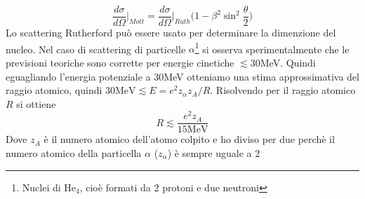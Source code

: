 \documentclass[11pt,a4paper]{article}
\begin{document}
		\begin{equation}
			\frac{d\sigma}{d\Omega}\Big|_{Mott}=\frac{d\sigma}{d\Omega}\Big|_{Ruth}\Big(1-\beta ^2\sin ^2\frac\theta 2\Big)
		\end{equation}
		Lo scattering Rutherford può essere usato per determinare la dimenzione del nucleo.\newline
		Nel caso di scattering di particelle $\alpha$\footnote{Nuclei di He$_4$, cioè formati da 2 protoni e due neutroni} si osserva sperimentalmente che le previsioni teoriche sono corrette per energie cinetiche  $\lesssim 30$MeV. Quindi eguagliando l'energia potenziale a $30$MeV otteniamo una stima approssimativa del raggio atomico, quindi $30 \textrm{MeV}\lesssim E=e^2z_\alpha z_A/R$. Risolvendo per il raggio atomico $R$ si ottiene
		\begin{equation}
			R\lesssim\frac{e^2z_A}{15 \textrm{MeV}}
		\end{equation}
		Dove $z_A$ è il numero atomico dell'atomo colpito e ho diviso per due perchè il numero atomico della particella $\alpha$ ($z_\alpha$) è sempre uguale a $2$
\end{document}

